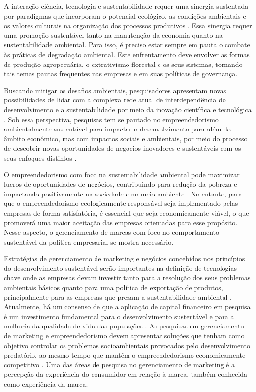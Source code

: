 A interação ciência, tecnologia e sustentabilidade requer uma sinergia sustentada por paradigmas que incorporam o potencial ecológico, as condições ambientais e os valores culturais na organização dos processos produtivos \cite{Garcia-Muina2018TheCompany,Morteza2019Eco-capabilityParadigm}. Essa sinergia requer uma promoção sustentável tanto na manutenção da economia quanto na sustentabilidade ambiental. Para isso, é preciso estar sempre em pauta o combate às práticas de degradação ambiental. Este enfrentamento deve envolver as formas de produção agropecuária, o extrativismo florestal e os seus sistemas, tornando tais temas pautas frequentes nas empresas e em suas políticas de governança.

Buscando mitigar os desafios ambientais, pesquisadores apresentam novas possibilidades de lidar com a complexa rede atual de interdependência do desenvolvimento e a sustentabilidade por meio da inovação científica e tecnológica \cite{Zeigermann2020ChallengesDevelopment}. Sob essa perspectiva, pesquisas tem se pautado no empreendedorismo ambientalmente sustentável para impactar o desenvolvimento para além do âmbito econômico, mas com impactos sociais e ambientais, por meio do processo de descobrir novas oportunidades de negócios inovadores e sustentáveis com os seus enfoques distintos \cite{Sepulveda2011, Davidsson2016}.

O empreendedorismo com foco na sustentabilidade ambiental pode maximizar lucros de oportunidades de negócios, contribuindo para redução da pobreza e impactando positivamente na sociedade e no meio ambiente \cite{Iqbal2021InsightsPerformance}. No entanto, para que o empreendedorismo ecologicamente responsável seja implementado pelas empresas de forma satisfatória, é essencial que seja economicamente viável, o que promoverá uma maior aceitação das empresas orientadas para esse propósito. Nesse aspecto, o gerenciamento de marcas com foco no comportamento sustentável da política empresarial se mostra necessário.

Estratégias de gerenciamento de marketing e negócios concebidos nos princípios do desenvolvimento sustentável serão importantes na definição de tecnologias-chave onde as empresas devam investir tanto para a resolução dos seus problemas ambientais básicos quanto para uma política de exportação de produtos, principalmente para as empresas que prezam a sustentabilidade ambiental \cite{Lewis2012107, Tugrul2017}. Atualmente, há um consenso de que a aplicação de capital financeiro em pesquisa é um investimento fundamental para o desenvolvimento sustentável e para a melhoria da qualidade de vida das populações \cite{Nevado-Pena2019ImprovingEurope,Ikram2021AssessingContext}. As pesquisas em gerenciamento de marketing e empreendedorismo devem apresentar soluções que tenham como objetivo controlar os problemas socioambientais provocados pelo desenvolvimento predatório, ao mesmo tempo que mantêm o empreendedorismo economicamente competitivo \cite{Loh2020,Liu2020b}. Uma das áreas de pesquisa no gerenciamento de marketing é a percepção da experiência do consumidor em relação à marca, também conhecida como experiência da marca.


